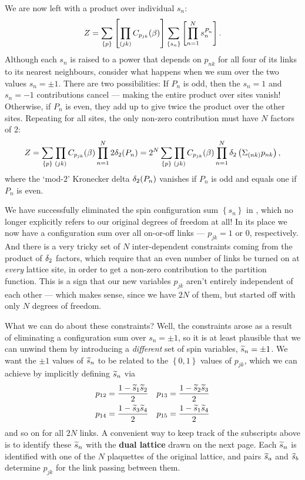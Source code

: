 We are now left with a product over individual $s_n$:
\begin{equation*}
  Z = \sum_{\left\{p\right\}} \left[\prod_{(jk)} C_{p_{jk}}(\beta)\right] \sum_{\left\{s_n\right\}} \left[\prod_{n = 1}^N s_n^{P_n}\right].
\end{equation*}
Although each $s_n$ is raised to a power that depends on $p_{nk}$ for all four of its links to its nearest neighbours, consider what happens when we sum over the two values $s_n = \pm 1$.
There are two possibilities: If $P_n$ is odd, then the $s_n = 1$ and $s_n = -1$ contributions cancel --- making the entire product over sites vanish!
Otherwise, if $P_n$ is even, they add up to give twice the product over the other sites.
Repeating for all sites, the only non-zero contribution must have $N$ factors of $2$:
\begin{equation}
  \label{eq:constrained_Ising}
  Z = \sum_{\left\{p\right\}} \prod_{(jk)} C_{p_{jk}}(\beta) \prod_{n = 1}^N 2\delta_2(P_n) = 2^N \sum_{\left\{p\right\}} \prod_{(jk)} C_{p_{jk}}(\beta) \prod_{n = 1}^N \delta_2\left(\Sigma_{(nk)} p_{nk}\right),
\end{equation}
where the `mod-$2$' Kronecker delta $\delta_2(P_n)$ vanishes if $P_n$ is odd and equals one if $P_n$ is even.

We have successfully eliminated the spin configuration sum $\left\{s_n\right\}$ in , which no longer explicitly refers to our original degrees of freedom at all!
In its place we now have a configuration sum over all on-or-off links --- $p_{jk} = 1$ or $0$, respectively.
And there is a very tricky set of $N$ inter-dependent constraints coming from the product of $\delta_2$ factors, which require that an even number of links be turned on at \textit{every} lattice site, in order to get a non-zero contribution to the partition function.
This is a sign that our new variables $p_{jk}$ aren't entirely independent of each other --- which makes sense, since we have $2N$ of them, but started off with only $N$ degrees of freedom.

What we can do about these constraints?
Well, the constraints arose as a result of eliminating a configuration sum over $s_n = \pm 1$, so it is at least plausible that we can unwind them by introducing a \textit{different} set of spin variables, $\widetilde s_n = \pm 1$.
We want the $\pm 1$ values of $\widetilde s_n$ to be related to the $\left\{0, 1\right\}$ values of $p_{jk}$, which we can achieve by implicitly defining $\widetilde s_n$ via
\begin{align*}
  p_{12} & = \frac{1 - \widetilde s_1 \widetilde s_2}{2} &
  p_{13} & = \frac{1 - \widetilde s_2 \widetilde s_3}{2} \\
  p_{14} & = \frac{1 - \widetilde s_3 \widetilde s_4}{2} &
  p_{15} & = \frac{1 - \widetilde s_1 \widetilde s_4}{2}
\end{align*}
and so on for all $2N$ links.
A convenient way to keep track of the subscripts above is to identify these $\widetilde s_n$ with the \textbf{dual lattice} drawn on the next page.
Each $\widetilde s_n$ is identified with one of the $N$ plaquettes of the original lattice, and pairs $\widetilde s_a$ and $\widetilde s_b$ determine $p_{jk}$ for the link passing between them.

